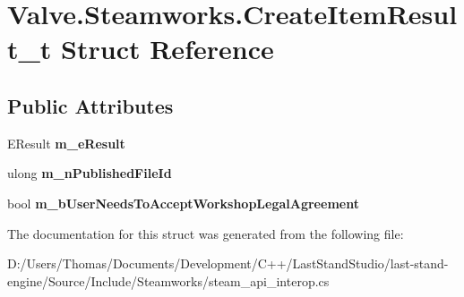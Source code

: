 \hypertarget{structValve_1_1Steamworks_1_1CreateItemResult__t}{}\section{Valve.\+Steamworks.\+Create\+Item\+Result\+\_\+t Struct Reference}
\label{structValve_1_1Steamworks_1_1CreateItemResult__t}
\subsection*{Public Attributes}
\begin{DoxyCompactItemize}
\item 
\hypertarget{structValve_1_1Steamworks_1_1CreateItemResult__t_a2933b17d3f355418f85117085c46a940}{}E\+Result {\bfseries m\+\_\+e\+Result}\label{structValve_1_1Steamworks_1_1CreateItemResult__t_a2933b17d3f355418f85117085c46a940}

\item 
\hypertarget{structValve_1_1Steamworks_1_1CreateItemResult__t_a334bcec8fc359b6a79906049bc2c665b}{}ulong {\bfseries m\+\_\+n\+Published\+File\+Id}\label{structValve_1_1Steamworks_1_1CreateItemResult__t_a334bcec8fc359b6a79906049bc2c665b}

\item 
\hypertarget{structValve_1_1Steamworks_1_1CreateItemResult__t_a149d669043fa084f52d8d65a6291103b}{}bool {\bfseries m\+\_\+b\+User\+Needs\+To\+Accept\+Workshop\+Legal\+Agreement}\label{structValve_1_1Steamworks_1_1CreateItemResult__t_a149d669043fa084f52d8d65a6291103b}

\end{DoxyCompactItemize}


The documentation for this struct was generated from the following file\+:\begin{DoxyCompactItemize}
\item 
D\+:/\+Users/\+Thomas/\+Documents/\+Development/\+C++/\+Last\+Stand\+Studio/last-\/stand-\/engine/\+Source/\+Include/\+Steamworks/steam\+\_\+api\+\_\+interop.\+cs\end{DoxyCompactItemize}
